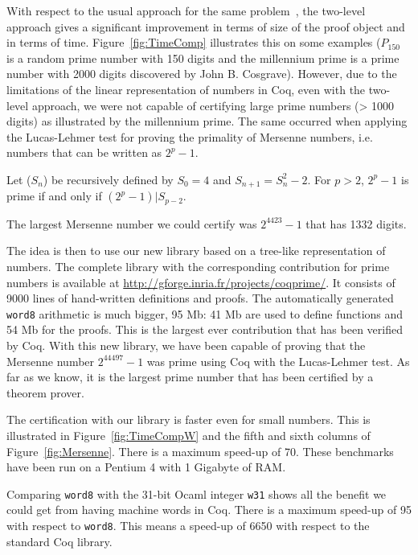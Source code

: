 With respect to the usual approach for the same 
problem~\cite{Caprotti_Oostdijk:01pockjsc}, the two-level
approach gives a significant improvement in terms of size of the
proof object and in terms of time.  
Figure~\ref{fig:TimeComp} illustrates this on some examples 
($P_{150}$ is a random prime number with 150 digits and the millennium prime is
a prime number with 2000 digits discovered by John B. Cosgrave).
However, due to the limitations of the linear representation of numbers in {\sc Coq},
even with the two-level approach, we were not capable of certifying large prime numbers 
(> 1000 digits) as illustrated by the millennium prime.
The same occurred when applying the Lucas-Lehmer test
for proving the primality of Mersenne numbers, 
i.e. numbers that can be written as $2 ^ p -1$.
\begin{theorem}\label{lucas}
Let ($S_n$) be recursively defined by $S_0= 4$ and $S_{n+1} = S_n^2 - 2$.
For $p > 2$, $2^p-1$ is prime if and only if $(2^p -1) | S_{p-2}$.
\end{theorem}
The largest Mersenne number we could certify was $2^{4423} - 1$ that has 1332 digits. 

The idea is then to use our new library based on a tree-like representation of numbers.
The complete library with the corresponding contribution for prime numbers 
is available at \url{http://gforge.inria.fr/projects/coqprime/}. 
It consists of 9000 lines of hand-written definitions and proofs. 
The automatically generated {\tt word8} arithmetic is much bigger,
95 Mb: 41 Mb are used to define functions and 54 Mb for the proofs. 
This is the largest ever contribution that has been verified by {\sc Coq}. 
With this new library, we have been capable of proving that the Mersenne number
$2^{44497} - 1$ was prime using {\sc Coq} with the Lucas-Lehmer test. 
As far as we know, it is the largest prime number  that has been certified 
by a theorem prover.

The certification with our library is faster even for  small numbers. 
This is illustrated in Figure~\ref{fig:TimeCompW} and the fifth and sixth  
columns of Figure~\ref{fig:Mersenne}. There is a maximum speed-up of 70. 
These benchmarks have been run on a Pentium 4 with 1 Gigabyte of RAM.

Comparing {\tt word8} with the 31-bit {\sc Ocaml} integer {\tt w31} shows 
all the benefit we could get from having machine words in {\sc Coq}. 
There is a maximum speed-up of 95 with respect to {\tt word8}. This
means a speed-up of 6650 with respect to the standard {\sc Coq} library.

